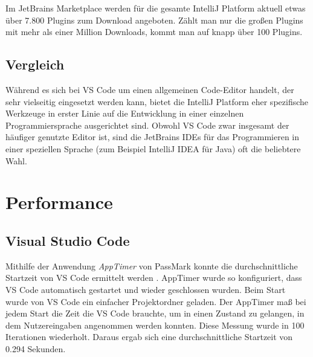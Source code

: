 Im JetBrains Marketplace werden für die gesamte IntelliJ Platform aktuell
etwas über 7.800 Plugins zum Download angeboten. Zählt man nur die 
großen Plugins mit mehr als einer Million Downloads, kommt man auf
knapp über 100 Plugins.

\subsection{Vergleich}

Während es sich bei VS Code um einen allgemeinen Code-Editor handelt,
der sehr vielseitig eingesetzt werden kann, bietet die IntelliJ Platform
eher spezifische Werkzeuge in erster Linie auf die Entwicklung in
einer einzelnen Programmiersprache ausgerichtet sind.
Obwohl VS Code zwar insgesamt der häufiger genutzte Editor ist,
sind die JetBrains IDEs für das Programmieren in einer 
speziellen Sprache (zum Beispiel IntelliJ IDEA für Java) oft die
beliebtere Wahl.



    

\section{Performance}
\label{sec:Vergleich_Performance}

\subsection{Visual Studio Code}

Mithilfe der Anwendung \emph{AppTimer} von PassMark konnte
die durchschnittliche Startzeit von VS Code ermittelt werden \cite{PassMarkAppTimer}.
AppTimer wurde so konfiguriert, dass VS Code automatisch gestartet
und wieder geschlossen wurden. Beim Start wurde von VS Code ein
einfacher Projektordner geladen. Der AppTimer maß bei jedem Start
die Zeit die VS Code brauchte, um in einen Zustand zu gelangen,
in dem Nutzereingaben angenommen werden konnten.
Diese Messung wurde in 100 Iterationen wiederholt.
Daraus ergab sich eine durchschnittliche Startzeit von 0.294 Sekunden.

